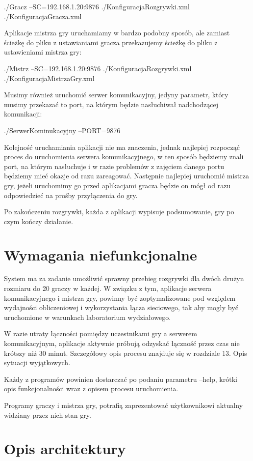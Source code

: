 \documentclass[a4paper]{article}
\begin{document}
./Gracz --SC=192.168.1.20:9876 ./KonfiguracjaRozgrywki.xml ./KonfiguracjaGracza.xml

Aplikacje mistrza gry uruchamiamy w bardzo podobny sposób, ale zamiast ścieżkę do pliku z ustawianiami gracza przekazujemy ścieżkę do pliku z ustawieniami mistrza gry:

./Mistrz --SC=192.168.1.20:9876 ./KonfiguracjaRozgrywki.xml ./KonfiguracjaMistrzaGry.xml

Musimy również uruchomić serwer komunikacyjny, jedyny parametr, który musimy przekazać to port, na którym będzie nasłuchiwał nadchodzącej komunikacji:

./SerwerKominukacyjny --PORT=9876

Kolejność uruchamiania aplikacji nie ma znaczenia, jednak najlepiej rozpocząć proces do uruchomienia serwera komunikacyjnego, w ten sposób będziemy znali port, na którym nasłuchuje i w razie problemów z zajęciem danego portu będziemy mieć okazje od razu zareagować. Następnie najlepiej uruchomić mistrza gry, jeżeli uruchomimy go przed aplikacjami gracza będzie on mógł od razu odpowiedzieć na prośby przyłączenia do gry.

Po zakończeniu rozgrywki, każda z aplikacji wypisuje podsumowanie, gry po czym kończy działanie.

\section{Wymagania niefunkcjonalne}
System ma za zadanie umożliwić sprawny przebieg rozgrywki dla dwóch drużyn rozmiaru do 20 graczy w każdej.
W związku z tym, aplikacje serwera komunikacyjnego i mistrza gry, powinny być zoptymalizowane pod względem wydajności obliczeniowej i wykorzystania łącza sieciowego, tak aby mogły być uruchomione w warunkach laboratorium wydziałowego. 

W razie utraty łączności pomiędzy uczestnikami gry a serwerem komunikacyjnym, aplikacje aktywnie próbują odzyskać łączność przez czas nie krótszy niż 30 minut. Szczegółowy opis procesu znajduje się w rozdziale 13. Opis sytuacji wyjątkowych.

Każdy z programów powinien dostarczać po podaniu parametru --help, krótki opis funkcjonalności wraz z opisem procesu uruchomienia.

Programy graczy i mistrza gry, potrafią zaprezentować użytkownikowi aktualny widziany przez nich stan gry. 
\section{Opis architektury}
\end{document}
